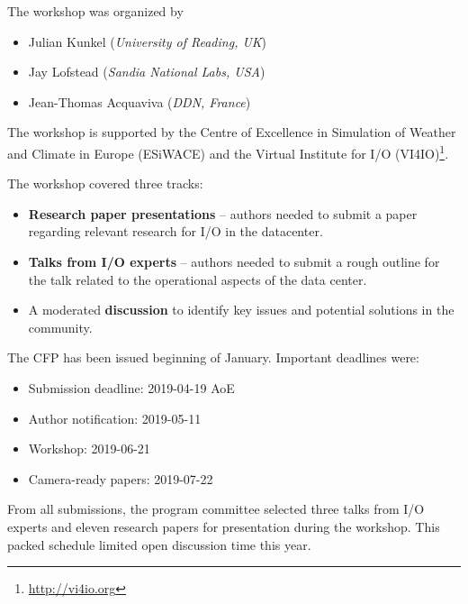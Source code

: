 \documentclass{llncs}
\begin{document}
The workshop was organized by

\begin{itemize}
	\item Julian Kunkel (\textit{University of Reading, UK})
	\item Jay Lofstead (\textit{Sandia National Labs, USA})
	\item Jean-Thomas Acquaviva (\textit{DDN, France})
\end{itemize}

\noindent The workshop is supported by the Centre of Excellence in Simulation of Weather and Climate in Europe (ESiWACE) and the Virtual Institute for I/O (VI4IO)\footnote{\url{http://vi4io.org}}.

\noindent The workshop covered three tracks:
\begin{itemize}
  \item \textbf{Research paper presentations} -- authors needed to submit a paper regarding relevant research for I/O in the datacenter.
  \item \textbf{Talks from I/O experts} -- authors needed to submit a rough outline for the talk related to the operational aspects of the data center.
  \item A moderated \textbf{discussion} to identify key issues and potential solutions in the community.
\end{itemize}

\noindent The CFP has been issued beginning of January.
Important deadlines were:
\begin{itemize}
  \item Submission deadline: 2019-04-19  AoE
  \item Author notification: 2019-05-11
  \item Workshop: 2019-06-21
  \item Camera-ready papers: 2019-07-22
\end{itemize}
From all submissions, the program committee selected three  talks from I/O experts and eleven research papers for presentation during the workshop. This packed schedule limited open discussion time this year.
\end{document}
